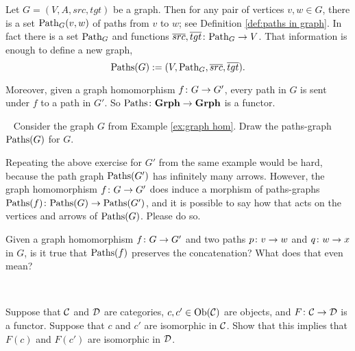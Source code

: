 \documentclass[CT4S-EN-RU]{subfiles}
\begin{document}
\begin{exerciseRUS}\label{exc:rephrase functors}
\end{exerciseRUS}

\begin{exampleENG}\label{ex:paths-graph}
Let $G=(V,A,src,tgt)$ be a graph. Then for any pair of vertices $v,w\in G$, there is a set $\textnormal{Path}_G(v,w)$ of paths from $v$ to $w$; see Definition \ref{def:paths in graph}. In fact there is a set $\textnormal{Path}_G$ and functions $\overline{src},\overline{tgt}\colon\textnormal{Path}_G\rightarrow V$. That information is enough to define a new graph, $$\textnormal{Paths}(G):=(V,\textnormal{Path}_G,\overline{src},\overline{tgt}).$$

Moreover, given a graph homomorphism $f\colon G\rightarrow G'$, every path in $G$ is sent under $f$ to a path in $G'$. So $\textnormal{Paths}\colon{\bf Grph}\rightarrow{\bf Grph}$ is a functor.
\end{exampleENG}

\begin{exampleRUS}\label{ex:paths-graph}
\end{exampleRUS}

\begin{exerciseENG}\label{exc:morphisms on paths-graphs}~
\sexc Consider the graph $G$ from Example \ref{ex:graph hom}. Draw the paths-graph $\textnormal{Paths}(G)$ for $G$. 
\item Repeating the above exercise for $G'$ from the same example would be hard, because the path graph $\textnormal{Paths}(G')$ has infinitely many arrows. However, the graph homomorphism $f\colon G\rightarrow G'$ does induce a morphism of paths-graphs $\textnormal{Paths}(f)\colon\textnormal{Paths}(G)\rightarrow\textnormal{Paths}(G')$, and it is possible to say how that acts on the vertices and arrows of $\textnormal{Paths}(G)$. Please do so.
\item Given a graph homomorphism $f\colon G\rightarrow G'$ and two paths $p\colon v\rightarrow w$ and $q\colon w\rightarrow x$ in $G$, is it true that $\textnormal{Paths}(f)$ preserves the concatenation? What does that even mean?
\endsexc
\end{exerciseENG}

\begin{exerciseRUS}\label{exc:morphisms on paths-graphs}~
\end{exerciseRUS}

\begin{exerciseENG}\label{exc:functors preserve isos}
Suppose that $\mathcal{C}$ and $\mathcal{D}$ are categories, $c,c'\in\textnormal{Ob}(\mathcal{C})$ are objects, and $F\colon\mathcal{C}\rightarrow\mathcal{D}$ is a functor. Suppose that $c$ and $c'$ are isomorphic in $\mathcal{C}$. Show that this implies that $F(c)$ and $F(c')$ are isomorphic in $\mathcal{D}$.
\end{exerciseENG}
\end{document}
